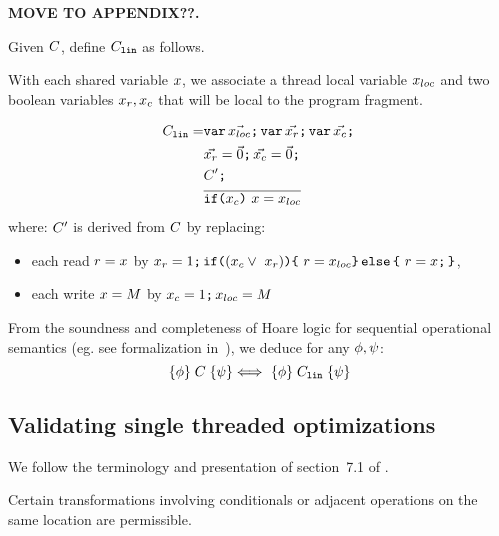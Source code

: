{\bf MOVE TO APPENDIX??.  

Given $C$, define 
$C_{{\tt lin}}$ as follows.
\begin{definition}
With each shared variable $x$, we associate a thread local variable $x_{{loc}}$ and two boolean variables $x_{r},x_{c}$ that will be local to the program fragment.  

\begin{align*}
C_{{\tt lin}}= & \texttt{var}\,\vec{x_{{loc}}} \texttt{;}\,\allowbreak \texttt{var}\, \vec{x_{r}} \texttt{;}\,\allowbreak \texttt{var}\, \vec{x_{c}} \texttt{;}\,\allowbreak  \\
& \vec{x_{r}} =\vec{0} \texttt{;}\,\allowbreak \vec{x_{c}} = \vec{0} \texttt{;}\,\allowbreak \\
& C' \texttt{;}\,\allowbreak   \\
& \overline{\texttt{if}\allowbreak\texttt{(}x_{c}\texttt{)}\  x= x_{{loc}}}
\end{align*}
where:
$C'$ is derived from $C$ by replacing:
\begin{itemize}
\item  each read $r = x$ by $\aRead = 1 \SEMI \IF {(\aChanged \lor\ \aRead)} \THEN\  \aReg= \aLocLoc \ELSE\  \aReg= \aLoc \SEMI \FI $,
\item each write $x = M$ by $x_{c} =1 \texttt{;}\,\allowbreak x_{{loc}} = M$
\end{itemize}
\end{definition}
From the soundness and completeness of Hoare logic for sequential operational semantics (eg. see formalization in~\citet{gordonHoare}), we deduce for any $\phi, \psi$: 
\[ \{\phi\}\allowbreak\;C\;\allowbreak\{\psi\}  \Longleftrightarrow\  \{\phi\}\allowbreak\;C_{{\tt lin}}\;\allowbreak\{\psi\} \]
}

\subsection{Validating single threaded optimizations}
We follow the terminology and presentation of section~7.1 of
\citet{Dolan:2018:BDR:3192366.3192421}.  

Certain transformations involving conditionals or adjacent operations on the same location are permissible. 
 
